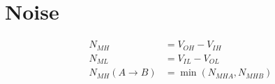 \section{Noise}
\begin{align}
    N_{MH} &= V_{OH} - V_{IH} \\
    N_{ML} &= V_{IL} - V_{OL} \\
    N_{MH}(A \rightarrow B) &= \min(N_{MHA}, N_{MHB}) 
\end{align}